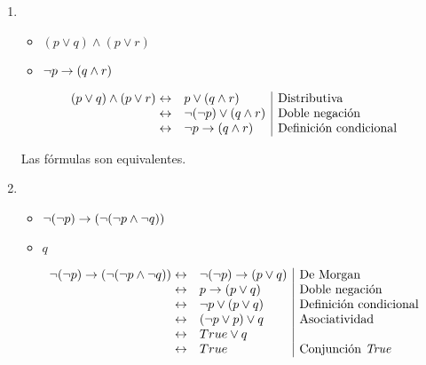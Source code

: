 \begin{enumerate}[label=\alph*)]
      \item \begin{itemize}
                  \item $(p \lor q) \land (p \lor r)$
                  \item $\neg p \rightarrow (q \land r)$
            \end{itemize}

            \[
                  \begin{array}{rl|l}
                        (p \lor q) \land (p \lor r) \leftrightarrow & p \lor (q \land r)             & \text{Distributiva}           \\
                        \leftrightarrow                             & \neg (\neg p) \lor (q \land r) & \text{Doble negación}         \\
                        \leftrightarrow                             & \neg p \rightarrow (q \land r)       & \text{Definición condicional}
                  \end{array}
            \]

            Las fórmulas son equivalentes.

      \item \begin{itemize}
                  \item $\neg (\neg p) \rightarrow (\neg (\neg p \land \neg q))$
                  \item $q$

            \end{itemize}

            \[
                  \begin{array}{rl|l}
                        \neg (\neg p) \rightarrow (\neg (\neg p \land \neg q)) \leftrightarrow & \neg (\neg p) \rightarrow (p \lor q) & \text{De Morgan}                \\
                        \leftrightarrow                                                  & p \rightarrow (p \lor q)             & \text{Doble negación}           \\
                        \leftrightarrow                                                  & \neg p \lor (p \lor q)         & \text{Definición condicional}   \\
                        \leftrightarrow                                                  & (\neg p \lor p) \lor q         & \text{Asociatividad}            \\
                        \leftrightarrow                                                  & True \lor q                                                      \\
                        \leftrightarrow                                                  & True                           & \text{Conjunción \textit{True}}
                  \end{array}
            \]


\end{enumerate}
